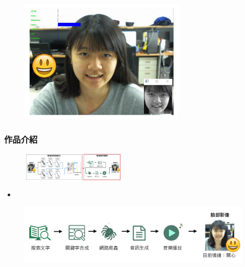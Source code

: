 \documentclass[10pt, conference, compsocconf]{beamer}
\begin{document}
\begin{CJK}{UTF8}{}
\begin{frame}
\begin{figure}[!t]
\begin{center}
\includegraphics[width=8cm]{./Figures/DetectResult.pdf}
\end{center}
\end{figure}
\end{frame}

\begin{frame}
\frametitle{作品介紹}

\vspace{-15mm}
\begin{figure}[t]
\begin{flushright}
\includegraphics[width=5cm]{./Figures/framework9.pdf}
\end{flushright}
\end{figure}

\vspace{-5mm}

\begin{itemize}
\item {}
\end{itemize}

\begin{figure}[!t]
\begin{center}
\includegraphics[width=12cm]{./Figures/FrameworkSecond.pdf}
\end{center}
\end{figure}
\end{frame}


\end{CJK}
\end{document}
